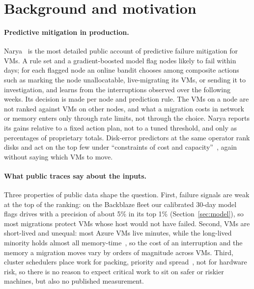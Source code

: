 \section{Background and motivation}
\label{sec:background}

\paragraph{Predictive mitigation in production.}
Narya~\cite{levy2020narya} is the most detailed public account of predictive failure mitigation
for VMs. A rule set and a gradient-boosted model flag nodes likely to fail within days; for each
flagged node an online bandit chooses among composite actions such as marking the node
unallocatable, live-migrating its VMs, or sending it to investigation, and learns from the
interruptions observed over the following weeks. Its decision is made per node and prediction
rule. The VMs on a node are not ranked against VMs on other nodes, and what a migration costs in
network or memory enters only through rate limits, not through the choice. Narya reports its gains
relative to a fixed action plan, not to a tuned threshold, and only as percentages of
proprietary totals. Disk-error predictors at the same operator rank disks and act on the top few
under ``constraints of cost and capacity''~\cite{xu2018cdef}, again without saying which VMs to
move.

\paragraph{What public traces say about the inputs.}
Three properties of public data shape the question. First, failure signals are weak at the top of
the ranking: on the Backblaze fleet our calibrated 30-day model flags drives with a precision of
about 5\% in its top 1\% (Section~\ref{sec:model}), so most migrations protect VMs whose host
would not have failed. Second, VMs are short-lived and unequal: most Azure VMs live minutes, while
the long-lived minority holds almost all memory-time~\cite{cortez2017resource}, so the cost of an
interruption and the memory a migration moves vary by orders of magnitude across VMs. Third,
cluster schedulers place work for packing, priority and spread~\cite{tirmazi2020borg,hadary2020protean},
not for hardware risk, so there is no reason to expect critical work to sit on safer or riskier
machines, but also no published measurement.

